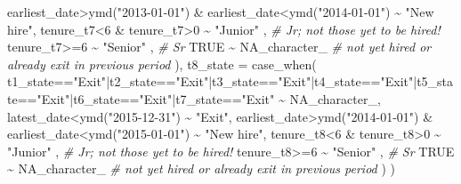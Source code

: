 \documentclass[
]{article}
\newenvironment{Shaded}{\begin{snugshade}}{\end{snugshade}}
\newcommand{\AttributeTok}[1]{\textcolor[rgb]{0.77,0.63,0.00}{#1}}
\newcommand{\CommentTok}[1]{\textcolor[rgb]{0.56,0.35,0.01}{\textit{#1}}}
\newcommand{\ConstantTok}[1]{\textcolor[rgb]{0.00,0.00,0.00}{#1}}
\newcommand{\DecValTok}[1]{\textcolor[rgb]{0.00,0.00,0.81}{#1}}
\newcommand{\FunctionTok}[1]{\textcolor[rgb]{0.00,0.00,0.00}{#1}}
\newcommand{\NormalTok}[1]{#1}
\newcommand{\SpecialCharTok}[1]{\textcolor[rgb]{0.00,0.00,0.00}{#1}}
\newcommand{\StringTok}[1]{\textcolor[rgb]{0.31,0.60,0.02}{#1}}
\begin{document}
\begin{Shaded}
\begin{Highlighting}[]
\NormalTok{      earliest\_date}\SpecialCharTok{\textgreater{}}\FunctionTok{ymd}\NormalTok{(}\StringTok{"2013{-}01{-}01"}\NormalTok{) }
        \SpecialCharTok{\&}\NormalTok{ earliest\_date}\SpecialCharTok{\textless{}}\FunctionTok{ymd}\NormalTok{(}\StringTok{"2014{-}01{-}01"}\NormalTok{) }\SpecialCharTok{\textasciitilde{}} \StringTok{"New hire"}\NormalTok{,}
\NormalTok{      tenure\_t7}\SpecialCharTok{\textless{}}\DecValTok{6} \SpecialCharTok{\&}\NormalTok{ tenure\_t7}\SpecialCharTok{\textgreater{}}\DecValTok{0}          \SpecialCharTok{\textasciitilde{}} \StringTok{"Junior"}\NormalTok{  , }\CommentTok{\# Jr; not those yet to be hired!}
\NormalTok{      tenure\_t7}\SpecialCharTok{\textgreater{}=}\DecValTok{6}                       \SpecialCharTok{\textasciitilde{}} \StringTok{"Senior"}\NormalTok{  , }\CommentTok{\# Sr}
      \ConstantTok{TRUE}                               \SpecialCharTok{\textasciitilde{}} \ConstantTok{NA\_character\_} \CommentTok{\# not yet hired or already exit in previous period}
\NormalTok{      ),}
    \AttributeTok{t8\_state =} \FunctionTok{case\_when}\NormalTok{(}
\NormalTok{      t1\_state}\SpecialCharTok{==}\StringTok{"Exit"}\SpecialCharTok{|}\NormalTok{t2\_state}\SpecialCharTok{==}\StringTok{"Exit"}\SpecialCharTok{|}\NormalTok{t3\_state}\SpecialCharTok{==}\StringTok{"Exit"}\SpecialCharTok{|}\NormalTok{t4\_state}\SpecialCharTok{==}\StringTok{"Exit"}\SpecialCharTok{|}\NormalTok{t5\_state}\SpecialCharTok{==}\StringTok{"Exit"}\SpecialCharTok{|}\NormalTok{t6\_state}\SpecialCharTok{==}\StringTok{"Exit"}\SpecialCharTok{|}\NormalTok{t7\_state}\SpecialCharTok{==}\StringTok{"Exit"}                   \SpecialCharTok{\textasciitilde{}} \ConstantTok{NA\_character\_}\NormalTok{,}
\NormalTok{      latest\_date}\SpecialCharTok{\textless{}}\FunctionTok{ymd}\NormalTok{(}\StringTok{"2015{-}12{-}31"}\NormalTok{)        }\SpecialCharTok{\textasciitilde{}} \StringTok{"Exit"}\NormalTok{,}
\NormalTok{      earliest\_date}\SpecialCharTok{\textgreater{}}\FunctionTok{ymd}\NormalTok{(}\StringTok{"2014{-}01{-}01"}\NormalTok{) }
        \SpecialCharTok{\&}\NormalTok{ earliest\_date}\SpecialCharTok{\textless{}}\FunctionTok{ymd}\NormalTok{(}\StringTok{"2015{-}01{-}01"}\NormalTok{) }\SpecialCharTok{\textasciitilde{}} \StringTok{"New hire"}\NormalTok{,}
\NormalTok{      tenure\_t8}\SpecialCharTok{\textless{}}\DecValTok{6} \SpecialCharTok{\&}\NormalTok{ tenure\_t8}\SpecialCharTok{\textgreater{}}\DecValTok{0}          \SpecialCharTok{\textasciitilde{}} \StringTok{"Junior"}\NormalTok{  , }\CommentTok{\# Jr; not those yet to be hired!}
\NormalTok{      tenure\_t8}\SpecialCharTok{\textgreater{}=}\DecValTok{6}                       \SpecialCharTok{\textasciitilde{}} \StringTok{"Senior"}\NormalTok{  , }\CommentTok{\# Sr}
      \ConstantTok{TRUE}                               \SpecialCharTok{\textasciitilde{}} \ConstantTok{NA\_character\_} \CommentTok{\# not yet hired or already exit in previous period}
\NormalTok{      )}
\NormalTok{    )}


\end{Highlighting}
\end{Shaded}
\end{document}
